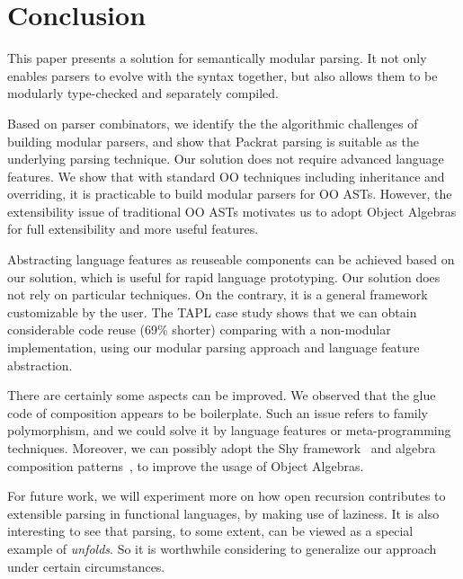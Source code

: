 \section{Conclusion}\label{sec:conclusion}

This paper presents a solution for semantically modular parsing. It not only
enables parsers to evolve with the syntax together, but also allows them to be modularly type-checked and separately compiled.

Based on parser combinators, we identify the the algorithmic challenges of building modular parsers, and show that Packrat parsing is suitable as the underlying parsing technique. Our solution does not require advanced language features. We show that with standard OO techniques including inheritance and overriding, it is practicable to build modular parsers for OO ASTs. However, the extensibility issue of traditional OO ASTs motivates us to adopt Object Algebras for full extensibility and more useful features.

Abstracting language features as reuseable components can be achieved based on our solution, which is useful for rapid language prototyping. Our solution does not rely on particular techniques. On the contrary, it is a general framework customizable by the user. The TAPL case study shows that we can obtain considerable code reuse (69\% shorter) comparing with a non-modular implementation, using our modular parsing approach and language feature abstraction.

There are certainly some aspects can be improved. We observed that the glue code of composition appears to be boilerplate. Such an issue refers to family polymorphism, and we could solve it by language features or meta-programming techniques. Moreover, we can possibly adopt the Shy framework~\cite{Zhang2015} and algebra composition patterns~\cite{oliveira2013feature}, to improve the usage of Object Algebras.

For future work, we will experiment more on how open recursion contributes to extensible parsing in functional languages, by making use of laziness. It is also interesting to see that parsing, to some extent, can be viewed as a special example of \textit{unfolds}. So it is worthwhile considering to generalize our approach under certain circumstances.
